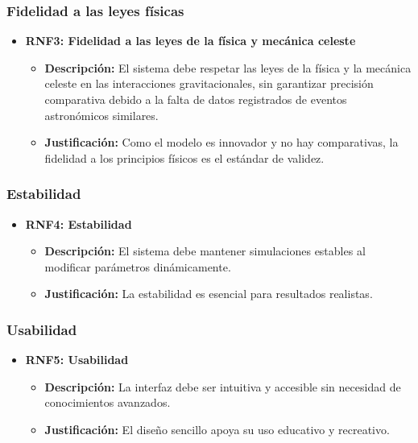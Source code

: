\subsubsection{Fidelidad a las leyes físicas}
\begin{itemize}
    \item \textbf{RNF3: Fidelidad a las leyes de la física y mecánica celeste}
    \begin{itemize}
        \item \textbf{Descripción:} El sistema debe respetar las leyes de la física y la mecánica celeste en las interacciones gravitacionales, sin garantizar precisión comparativa debido a la falta de datos registrados de eventos astronómicos similares.
        \item \textbf{Justificación:} Como el modelo es innovador y no hay comparativas, la fidelidad a los principios físicos es el estándar de validez.
    \end{itemize}
\end{itemize}

\subsubsection{Estabilidad}
\begin{itemize}
    \item \textbf{RNF4: Estabilidad}
    \begin{itemize}
        \item \textbf{Descripción:} El sistema debe mantener simulaciones estables al modificar parámetros dinámicamente.
        \item \textbf{Justificación:} La estabilidad es esencial para resultados realistas.
    \end{itemize}
\end{itemize}

\subsubsection{Usabilidad}
\begin{itemize}
    \item \textbf{RNF5: Usabilidad}
    \begin{itemize}
        \item \textbf{Descripción:} La interfaz debe ser intuitiva y accesible sin necesidad de conocimientos avanzados.
        \item \textbf{Justificación:} El diseño sencillo apoya su uso educativo y recreativo.
    \end{itemize}
\end{itemize}

